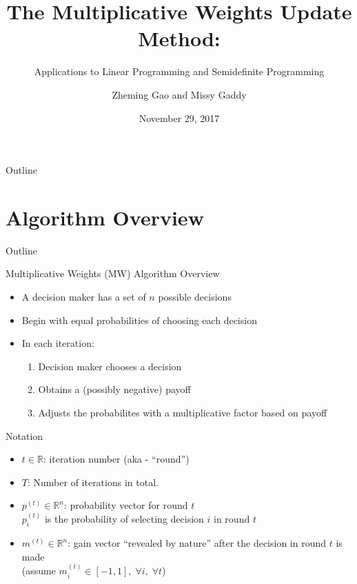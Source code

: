 \documentclass{beamer}
\title[MW Algorithm]{The Multiplicative Weights Update Method:}
\subtitle{Applications to Linear Programming and Semidefinite Programming}
\author[Gao, Gaddy]{Zheming Gao and Missy Gaddy}
\institute{Based on paper by Arora, Hazan, and Kale (2012)}
\date{November 29, 2017}
\begin{document}
\begin{frame}
  \titlepage
\end{frame}
\begin{frame}{Outline}
  \tableofcontents 
\end{frame}

\section{Algorithm Overview}
\begin{frame}{Outline}
  \tableofcontents[currentsection]
\end{frame}

\begin{frame}{Multiplicative Weights (MW) Algorithm Overview}
\begin{itemize}
\item A decision maker has a set of $n$ possible decisions
\item Begin with equal probabilities of choosing each decision
\item In each iteration:
\begin{enumerate}
\setlength\itemsep{1em}
\item Decision maker chooses a decision
\item Obtains a (possibly negative) payoff
\item Adjusts the probabilites with a multiplicative factor based on payoff
\end{enumerate}
\end{itemize}
\end{frame}

\begin{frame}{Notation}
\begin{itemize}
\setlength\itemsep{2em}
\item $t \in \mathbb{R}$: iteration number (aka - ``round'') 
\item $T$: Number of iterations in total.

\item $p^{(t)} \in \mathbb{R}^n$: probability vector for round $t$ \\
 $p^{(t)}_i$ is the probability of selecting decision $i$ in round $t$ \\
\item $m^{(t)} \in \mathbb{R}^n$: gain vector ``revealed by nature'' after the decision in round $t$ is made \\
 (assume $m_i^{(t)} \in [-1, 1], \; \forall i, \; \forall t$)
\end{itemize}
\end{frame}
\end{document}

